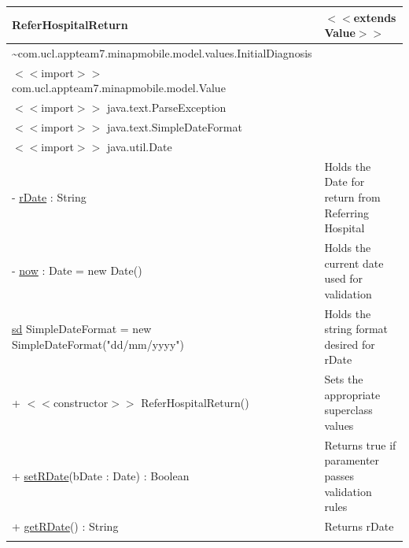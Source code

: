 \documentclass[12pt,a4paper,oneside,titlepage]{article}
\begin{document}
\begin{center}
	\begin{tabular}{| p{13cm} | p{5cm} |}
	\hline
	\textbf{ReferHospitalReturn} & \textbf{$<<$extends Value$>>$} \\ \hline
	\textasciitilde com.ucl.appteam7.minapmobile.model.values.InitialDiagnosis	  & \\ \hline
$<<$import$>>$ com.ucl.appteam7.minapmobile.model.Value	 &  \\ \hline
$<<$import$>>$ java.text.ParseException	 &  \\ \hline
$<<$import$>>$ java.text.SimpleDateFormat	 &  \\ \hline
$<<$import$>>$ java.util.Date	 &  \\ \hline \hline
- \underline{rDate} : String	 & Holds the Date for return from Referring Hospital \\ \hline
- \underline{now} : Date = new Date()	 & Holds the current date used for validation \\ \hline
\underline{sd} SimpleDateFormat = new SimpleDateFormat("dd/mm/yyyy")	 & Holds the string format desired for rDate \\ \hline \hline
+ $<<$constructor$>>$ ReferHospitalReturn()	 & Sets the appropriate superclass values \\ \hline
+ \underline{setRDate}(bDate : Date) : Boolean	 & Returns true if paramenter passes validation rules \\ \hline
+ \underline{getRDate}() : String	 & Returns rDate \\& \\ \hline
	\end{tabular}
\end{center}
\end{document}
